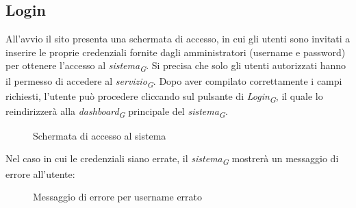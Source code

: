 \subsection{Login}

All'avvio il sito presenta una schermata di accesso, in cui gli utenti sono invitati a inserire le proprie credenziali fornite dagli amministratori (username e password) per ottenere l'accesso al \textit{sistema}\textsubscript{\textit{G}}. Si precisa che solo gli utenti autorizzati hanno il permesso di accedere al \textit{servizio}\textsubscript{\textit{G}}. Dopo aver compilato correttamente i campi richiesti, l'utente può procedere cliccando sul pulsante di \textit{Login}\textsubscript{\textit{G}}, il quale lo reindirizzerà alla \textit{dashboard}\textsubscript{\textit{G}} principale del \textit{sistema}\textsubscript{\textit{G}}. \\
\begin{figure}[H]
    \centering
    \caption{Schermata di accesso al sistema}
    \label{fig:my_label}
\end{figure}
Nel caso in cui le credenziali siano errate, il \textit{sistema}\textsubscript{\textit{G}} mostrerà un messaggio di errore all’utente:\\
\begin{figure}[H]
    \centering
    \caption{Messaggio di errore per username errato}
    \label{fig:my_label}
\end{figure}